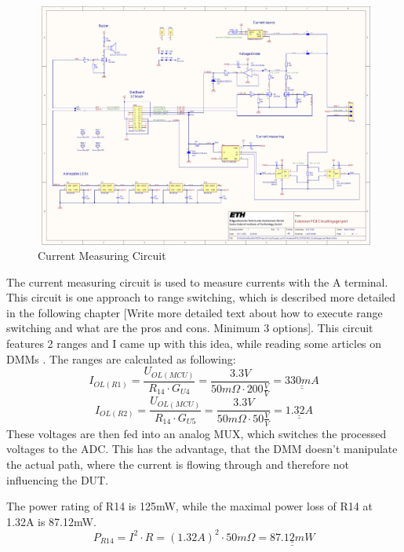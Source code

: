 \begin{figure}[H]
	\centering
	\includegraphics[width=14cm, trim={19.5cm 5cm 1cm 14.5cm}, clip]{../../../5_Hardware/PCB_EXTENSION_CircuitVoyager_pre1/Project Outputs for PCB_EXT_CV_PRE1/Schematic_PCB_EXTENSION_CircuitVoyager_pre1.pdf}
	\caption{Current Measuring Circuit}
	\label{fig:Current Measuring Circuit}
\end{figure}

The current measuring circuit is used to measure currents with the A terminal. This circuit is one approach to range switching, which is described more detailed in the following chapter [Write more detailed text about how to execute range switching and what are the pros and cons. Minimum 3 options]. This circuit features 2 ranges and I came up with this idea, while reading some articles on DMMs \cite{Digital_multimeter_circuit_using_ICL7107} \cite{AN-202_A_Digital_Multimeter_Using_the_ADD3501}. The ranges are calculated as following:
\[I_{OL(R1)} = \frac{U_{OL(MCU)}}{R_{14} \cdot G_{U4}} = \frac{3.3V}{50m\Omega \cdot 200\frac{V}{V}} = \underline{\underline{330mA}}\]
\[I_{OL(R2)} = \frac{U_{OL(MCU)}}{R_{14} \cdot G_{U5}} = \frac{3.3V}{50m\Omega \cdot 50\frac{V}{V}} = \underline{\underline{1.32A}}\]
These voltages are then fed into an analog MUX, which switches the processed voltages to the ADC. This has the advantage, that the DMM doesn't manipulate the actual path, where the current is flowing through and therefore not influencing the DUT.

The power rating of R14 is 125mW, while the maximal power loss of R14 at 1.32A is 87.12mW.
\[P_{R14} = I^2 \cdot R = (1.32A)^2 \cdot 50m \Omega = \underline{\underline{87.12mW}}\]



